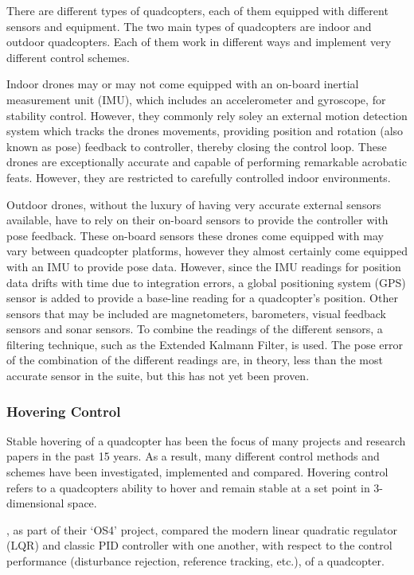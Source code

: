 There are different types of quadcopters, each of them equipped with different sensors and equipment. The two main types of quadcopters are indoor and outdoor quadcopters. Each of them work in different ways and implement very different control schemes. 

Indoor drones may or may not come equipped with an on-board inertial measurement unit (IMU), which includes an accelerometer and gyroscope, for stability control. However, they commonly rely soley an external motion detection system which tracks the drones movements, providing position and rotation (also known as pose) feedback to controller, thereby closing the control loop. These drones are exceptionally accurate and capable of performing remarkable acrobatic feats. However, they are restricted to carefully controlled indoor environments.

Outdoor drones, without the luxury of having very accurate external sensors available, have to rely on their on-board sensors to provide the controller with pose feedback. These on-board sensors these drones come equipped with may vary between quadcopter platforms, however they almost certainly come equipped with an IMU to provide pose data. However, since the IMU readings for position data drifts with time due to integration errors, a global positioning system (GPS) sensor is added to provide a base-line reading for a quadcopter's position. Other sensors that may be included are magnetometers, barometers, visual feedback sensors and sonar sensors. To combine the readings of the different sensors, a filtering technique, such as the Extended Kalmann Filter, is used. The pose error of the combination of the different readings are, in theory, less than the most accurate sensor in the suite, but this has not yet been proven. 

\subsubsection{Hovering Control}

Stable hovering of a quadcopter has been the focus of many projects and research papers in the past 15 years. As a result, many different control methods and schemes have been investigated, implemented and compared. Hovering control refers to a quadcopters ability to hover and remain stable at a set point in 3-dimensional space.

\cite{bouabdallah2004pid}, as part of their `OS4' project, compared the modern linear quadratic regulator (LQR) and classic PID controller with one another, with respect to the control performance (disturbance rejection, reference tracking, etc.), of a quadcopter.

